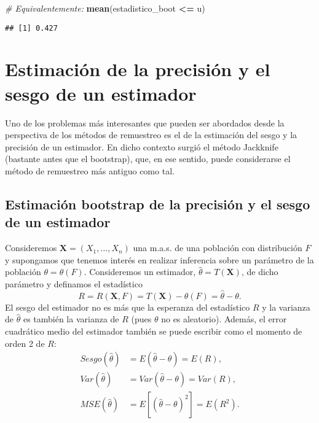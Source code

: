 \documentclass[
]{book}
\newenvironment{Shaded}{\begin{snugshade}}{\end{snugshade}}
\newcommand{\CommentTok}[1]{\textcolor[rgb]{0.56,0.35,0.01}{\textit{#1}}}
\newcommand{\KeywordTok}[1]{\textcolor[rgb]{0.13,0.29,0.53}{\textbf{#1}}}
\newcommand{\NormalTok}[1]{#1}
\newcommand{\OperatorTok}[1]{\textcolor[rgb]{0.81,0.36,0.00}{\textbf{#1}}}
\newcommand{\StringTok}[1]{\textcolor[rgb]{0.31,0.60,0.02}{#1}}
\theoremstyle{break}
\theoremstyle{definition}
\theoremstyle{definition}
\theoremstyle{definition}
\theoremstyle{remark}
\begin{document}
\begin{Shaded}
\begin{Highlighting}[]
\CommentTok{# Equivalentemente:}
\KeywordTok{mean}\NormalTok{(estadistico_boot }\OperatorTok{<=}\StringTok{ }\NormalTok{u)}
\end{Highlighting}
\end{Shaded}

\begin{verbatim}
## [1] 0.427
\end{verbatim}

\hypertarget{prec-sesgo}{%
\chapter{Estimación de la precisión y el sesgo de un estimador}\label{prec-sesgo}}

Uno de los problemas más interesantes que pueden ser abordados desde la
perspectiva de los métodos de remuestreo es el de la estimación del
sesgo y la precisión de un estimador. En dicho contexto surgió el método
Jackknife (bastante antes que el bootstrap), que, en ese sentido, puede
considerarse el método de remuestreo más antiguo como tal.

\hypertarget{prec-sesgo-boot}{%
\section{Estimación bootstrap de la precisión y el sesgo de un estimador}\label{prec-sesgo-boot}}

Consideremos \(\mathbf{X}=\left( X_1,\ldots ,X_n \right)\) una
m.a.s. de una población con distribución \(F\) y supongamos que tenemos
interés en realizar inferencia sobre un parámetro de la población
\(\theta =\theta \left( F \right)\). Consideremos un estimador,
\(\hat{\theta}=T\left( \mathbf{X} \right)\), de dicho parámetro y
definamos el estadístico
\[R=R\left( \mathbf{X}, F \right) = T\left( \mathbf{X} \right) 
- \theta \left( F \right) = \hat{\theta} - \theta.\]
El sesgo del estimador no es más que la esperanza del
estadístico \(R\) y la varianza de \(\hat{\theta}\) es también la varianza
de \(R\) (pues \(\theta\) no es aleatorio). Además, el error cuadrático
medio del estimador también se puede escribir como el momento de orden 2
de \(R\):
\[\begin{aligned}
Sesgo\left( \hat{\theta} \right) &= E\left( \hat{\theta}-\theta \right)
=E\left( R \right), \\
Var\left( \hat{\theta} \right) &= Var\left( \hat{\theta}-\theta \right)
=Var\left( R \right), \\
MSE\left( \hat{\theta} \right) &= E\left[ \left( \hat{\theta}-\theta \right)
^2\right] =E\left( R^2 \right).
\end{aligned}\]
\end{document}

